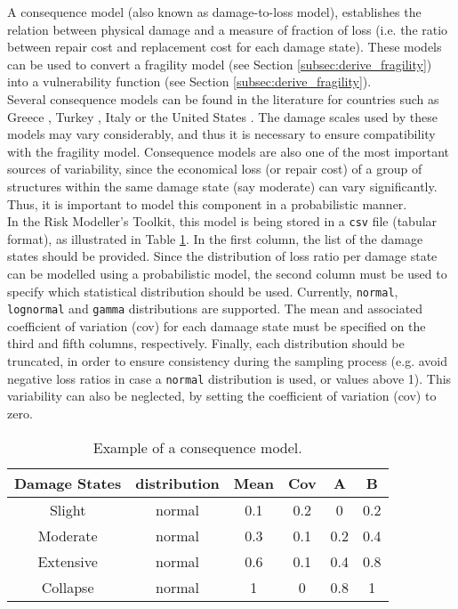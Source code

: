 A consequence model (also known as damage-to-loss model), establishes the relation between physical damage and a measure of fraction of loss (i.e. the ratio between repair cost and replacement cost for each damage state). These models can be used to convert a fragility model (see Section \ref{subsec:derive_fragility}) into a vulnerability function (see Section \ref{subsec:derive_fragility}). \\

Several consequence models can be found in the literature for countries such as Greece \citep{KapposEtAl2006}, Turkey \citep{BalEtAl2010}, Italy \citep{DiPasqualeandGoretti2001} or the United States \citep{FEMA2003}. The damage scales used by these models may vary considerably, and thus it is necessary to ensure compatibility with the fragility model. Consequence models are also one of the most important sources of variability, since the economical loss (or repair cost) of a group of structures within the same damage state (say moderate) can vary significantly. Thus, it is important to model this component in a probabilistic manner.\\

In the Risk Modeller's Toolkit, this model is being stored in a \verb=csv= file (tabular format), as illustrated in Table \ref{table:cons_model}. In the first column, the list of the damage states should be provided. Since the distribution of loss ratio per damage state can be modelled using a probabilistic model, the second column must be used to specify which statistical distribution should be used. Currently, \verb=normal=, \verb=lognormal= and \verb=gamma= distributions are supported. The mean and associated coefficient of variation (cov) for each damaage state must be specified on the third and fifth columns, respectively. Finally, each distribution should be truncated, in order to ensure consistency during the sampling process (e.g. avoid negative loss ratios in case a \verb=normal= distribution is used, or values above 1). This variability can also be neglected, by setting the coefficient of variation (cov) to zero.

\begin {table}[htb]
\caption{Example of a consequence model.}
\label{table:cons_model}
\begin{center}
  \begin{tabular}{ | c | c | c | c | c | c |}
  \hline
Damage States & distribution & Mean & Cov & A & B\\ \hline
Slight & normal & 0.1 & 0.2 & 0 & 0.2\\ \hline
Moderate & normal & 0.3 & 0.1 & 0.2 & 0.4\\ \hline
Extensive & normal & 0.6 & 0.1 & 0.4 & 0.8\\ \hline
Collapse & normal & 1 & 0 & 0.8 & 1\\ \hline
  \end{tabular}
\end{center}
\end{table}

